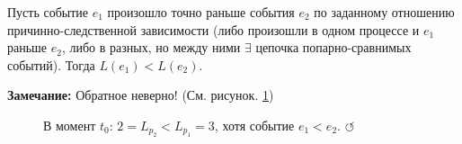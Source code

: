\begin{theorem}
Пусть событие $e_1$ произошло точно раньше события $e_2$ по заданному отношению причинно-следственной зависимости (либо произошли в одном процессе и $e_1$ раньше $e_2$, либо в разных, но между ними $\exists$ цепочка попарно-сравнимых событий).
Тогда $L(e_1) < L(e_2)$.
\end{theorem}
\textbf{\hypertarget{backto}{Замечание:}} Обратное неверно! (См. рисунок. \ref{fig:image_Сomparison})
\begin{figure}[h!]
\caption{В момент $t_0$: $2 = L_{p_2} < L_{p_1} = 3$, хотя событие $e_1 < e_2$. \protect\hyperlink{backto}{$\circlearrowleft$}}
\label{fig:image_Сomparison}
\end{figure}
        
